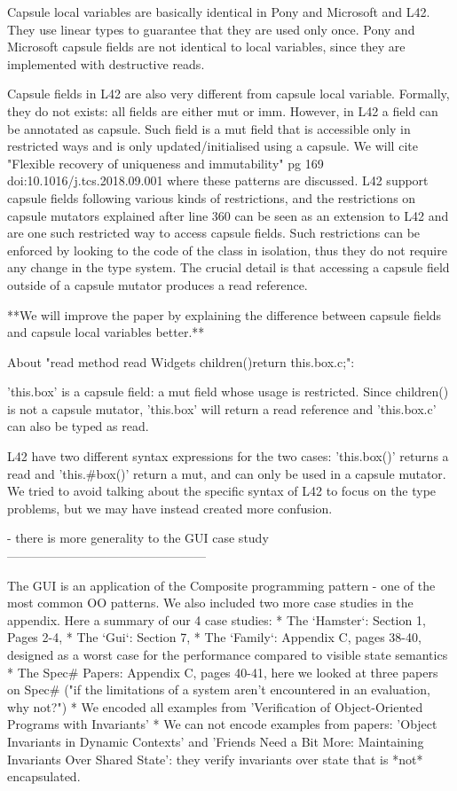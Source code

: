 Capsule local variables are basically identical in Pony and Microsoft and L42. They use linear types to
guarantee that they are used only once.
Pony and Microsoft capsule fields are not identical to local variables,
since they are implemented with destructive reads.

Capsule fields in L42 are also very different from capsule local variable.
Formally, they do not exists: all fields are either mut or imm.
However, in L42 a field can be annotated as capsule.
Such field is a mut field that is accessible only in restricted ways and is only
updated/initialised using a capsule.
We will cite "Flexible recovery of uniqueness and immutability" 
pg 169 doi:10.1016/j.tcs.2018.09.001 where these patterns are discussed.
L42 support capsule fields following various kinds of restrictions, and 
the restrictions on capsule mutators explained after line 360
can be seen as an extension to L42 and are one such restricted way to access capsule fields.
Such restrictions can be enforced by looking to the code of the class in isolation,
thus they do not require any change in the type system.
The crucial detail is that accessing a capsule field outside of a capsule mutator
produces a read reference.

**We will improve the paper by explaining the difference between capsule fields and capsule local variables better.**

About "read method read Widgets children(){return this.box.c;}":

'this.box' is a capsule field: a mut field whose usage is restricted.
Since children() is not a capsule mutator, 'this.box' will return a read reference
and 'this.box.c' can also be typed as read.

L42 have two different syntax expressions for the two cases: 'this.box()' returns a read
and 'this.#box()' return a mut, and can only be used in a capsule mutator.
We tried to avoid talking about the specific syntax of L42 to focus on the type problems,
but we may have instead created more confusion.


- there is more generality to the GUI case study
------------------------------------------------

The GUI is an application of the Composite programming pattern - one of the most common OO patterns.
We also included two more case studies in the appendix.
Here a summary of our 4 case studies:
* The `Hamster`: Section 1, Pages 2-4, 
* The `Gui`: Section 7,
* The `Family`: Appendix C, pages 38-40,
  designed as a worst case for the performance compared to visible state semantics
* The Spec# Papers: Appendix C, pages 40-41,
  here we looked at three papers on Spec# ("if the limitations of a system aren't encountered in an evaluation, why not?")
 *  We encoded all examples from 'Verification of Object-Oriented Programs with Invariants'
 *  We can not encode examples from  papers: 'Object Invariants in Dynamic Contexts' and
   'Friends Need a Bit More: Maintaining Invariants Over Shared State':
   they verify invariants over state that is *not* encapsulated.


